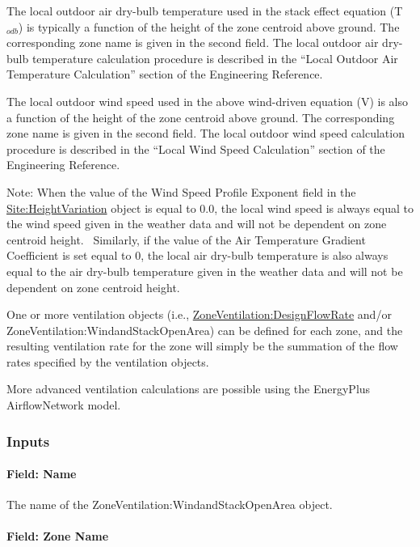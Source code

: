 The local outdoor air dry-bulb temperature used in the stack effect equation (T\(_{odb}\)) is typically a function of the height of the zone centroid above ground. The corresponding zone name is given in the second field. The local outdoor air dry-bulb temperature calculation procedure is described in the ``Local Outdoor Air Temperature Calculation'' section of the Engineering Reference.

The local outdoor wind speed used in the above wind-driven equation (V) is also a function of the height of the zone centroid above ground. The corresponding zone name is given in the second field. The local outdoor wind speed calculation procedure is described in the ``Local Wind Speed Calculation'' section of the Engineering Reference.

Note: When the value of the Wind Speed Profile Exponent field in the \hyperref[siteheightvariation]{Site:HeightVariation} object is equal to 0.0, the local wind speed is always equal to the wind speed given in the weather data and will not be dependent on zone centroid height.~ Similarly, if the value of the Air Temperature Gradient Coefficient is set equal to 0, the local air dry-bulb temperature is also always equal to the air dry-bulb temperature given in the weather data and will not be dependent on zone centroid height.

One or more ventilation objects (i.e., \hyperref[zoneventilationdesignflowrate]{ZoneVentilation:DesignFlowRate} and/or ZoneVentilation:WindandStackOpenArea) can be defined for each zone, and the resulting ventilation rate for the zone will simply be the summation of the flow rates specified by the ventilation objects.

More advanced ventilation calculations are possible using the EnergyPlus AirflowNetwork model.

\subsubsection{Inputs}\label{inputs-3-004}

\paragraph{Field: Name}\label{field-name-3-004}

The name of the ZoneVentilation:WindandStackOpenArea object.

\paragraph{Field: Zone Name}\label{field-zone-name-2016-06-16}

